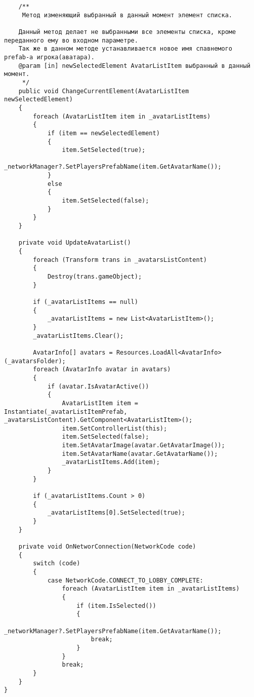 \begin{verbatim}
    /**
     Метод изменяющий выбранный в данный момент элемент списка.

    Данный метод делает не выбранными все элементы списка, кроме переданного ему во входном параметре.
    Так же в данном методе устанавливается новое имя спавнемого prefab-а игрока(аватара).
    @param [in] newSelectedElement AvatarListItem выбранный в данный момент.
     */
    public void ChangeCurrentElement(AvatarListItem newSelectedElement)
    {
        foreach (AvatarListItem item in _avatarListItems)
        {
            if (item == newSelectedElement)
            {
                item.SetSelected(true);
                _networkManager?.SetPlayersPrefabName(item.GetAvatarName());
            }
            else
            {
                item.SetSelected(false);
            }
        }
    }

    private void UpdateAvatarList()
    {
        foreach (Transform trans in _avatarsListContent)
        {
            Destroy(trans.gameObject);
        }

        if (_avatarListItems == null)
        {
            _avatarListItems = new List<AvatarListItem>();
        }
        _avatarListItems.Clear();

        AvatarInfo[] avatars = Resources.LoadAll<AvatarInfo>(_avatarsFolder);
        foreach (AvatarInfo avatar in avatars)
        {
            if (avatar.IsAvatarActive())
            {
                AvatarListItem item = Instantiate(_avatarListItemPrefab, _avatarsListContent).GetComponent<AvatarListItem>();
                item.SetControllerList(this);
                item.SetSelected(false);
                item.SetAvatarImage(avatar.GetAvatarImage());
                item.SetAvatarName(avatar.GetAvatarName());
                _avatarListItems.Add(item);
            }
        }

        if (_avatarListItems.Count > 0)
        {
            _avatarListItems[0].SetSelected(true);
        }
    }

    private void OnNetworConnection(NetworkCode code)
    {
        switch (code)
        {
            case NetworkCode.CONNECT_TO_LOBBY_COMPLETE:
                foreach (AvatarListItem item in _avatarListItems)
                {
                    if (item.IsSelected())
                    {
                        _networkManager?.SetPlayersPrefabName(item.GetAvatarName());
                        break;
                    }
                }
                break;
        }
    }
}

\end{verbatim}
